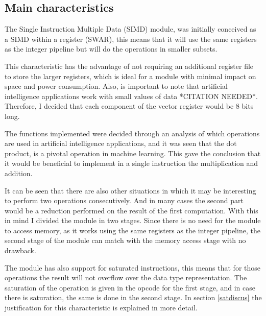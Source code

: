 \subsection{Main characteristics}
The Single Instruction Multiple Data (SIMD) module, was initially 
conceived as a SIMD within a register (SWAR), this means that it 
will use the same registers as the integer pipeline but will do 
the operations in smaller subsets. 

\medbreak
This characteristic has the advantage of not requiring an additional 
register file to store the larger registers, which is ideal for a 
module with minimal impact on space and power consumption. Also, is 
important to note that artificial intelligence applications work with 
small values of data *CITATION NEEDED*. Therefore, I decided that each
component of the vector register would be 8 bits long. 

\medbreak
The functions implemented were decided through an analysis of which 
operations are used in artificial intelligence applications, and it was seen
that the dot product, is a pivotal operation in machine learning\cite{MLanalysis}.
This gave the conclusion that it would be beneficial to implement in 
a single instruction the multiplication and addition. 

\medbreak
It can be seen that there are also other situations in which it may 
be interesting to perform two operations consecutively. And in many
cases the second part would be a reduction performed on the result of
the first computation. With this in mind I divided the module in two 
stages. Since there is no need for the module to access memory, as it
works using the same registers as the integer pipeline, the second stage 
of the module can match with the memory access stage with no drawback.

\medbreak
The module has also support for saturated instructions, this means that
for those operations the result will not overflow over the data type 
representation. The saturation of the operation is given in the opcode
for the first stage, and in case there is saturation, the same is done
in the second stage. In section \ref{satdiscus} the justification for 
this characteristic is explained in more detail.
 
